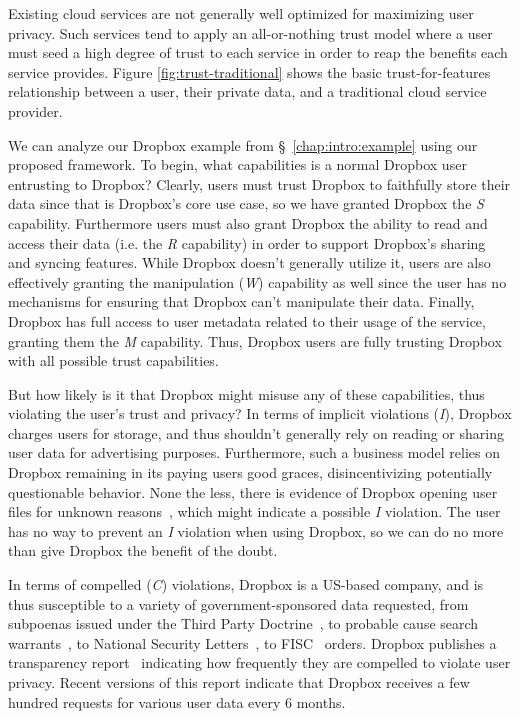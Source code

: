 Existing cloud services are not generally well optimized for
maximizing user privacy. Such services tend to apply an all-or-nothing
trust model where a user must seed a high degree of trust to each
service in order to reap the benefits each service provides. Figure
\ref{fig:trust-traditional} shows the basic trust-for-features
relationship between a user, their private data, and a traditional
cloud service provider.

We can analyze our Dropbox example from \S~\ref{chap:intro:example}
using our proposed framework. To begin, what capabilities is a normal
Dropbox user entrusting to Dropbox? Clearly, users must trust Dropbox
to faithfully store their data since that is Dropbox's core use case,
so we have granted Dropbox the \emph{S} capability. Furthermore users
must also grant Dropbox the ability to read and access their data
(i.e. the \emph{R} capability) in order to support Dropbox's sharing
and syncing features. While Dropbox doesn't generally utilize it,
users are also effectively granting the manipulation (\emph{W})
capability as well since the user has no mechanisms for ensuring
that Dropbox can't manipulate their data. Finally, Dropbox has full
access to user metadata related to their usage of the service,
granting them the \emph{M} capability. Thus, Dropbox users are fully
trusting Dropbox with all possible trust capabilities.

But how likely is it that Dropbox might misuse any of these
capabilities, thus violating the user's trust and privacy? In terms of
implicit violations (\emph{I}), Dropbox charges users for storage, and
thus shouldn't generally rely on reading or sharing user data for
advertising purposes. Furthermore, such a business model relies on
Dropbox remaining in its paying users good graces, disincentivizing
potentially questionable behavior. None the less, there is evidence of
Dropbox opening user files for unknown
reasons~\cite{vintsurf-dropbox}, which might indicate a possible
\emph{I} violation. The user has no way to prevent an \emph{I}
violation when using Dropbox, so we can do no more than give Dropbox
the benefit of the doubt.

In terms of compelled (\emph{C}) violations, Dropbox is a US-based
company, and is thus susceptible to a variety of government-sponsored
data requested, from subpoenas issued under the Third Party
Doctrine~\cite{thompson-thirdparty}, to probable cause search
warrants~\cite{us-constitution-amend4}, to National Security
Letters~\cite{fbi-nsl}, to FISC~\cite{fisc} orders. Dropbox publishes
a transparency report~\cite{dropbox-transparency} indicating how
frequently they are compelled to violate user privacy. Recent versions
of this report indicate that Dropbox receives a few hundred requests
for various user data every 6 months.


